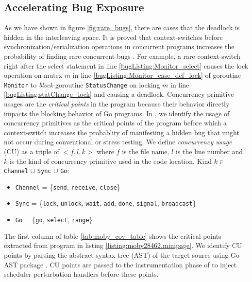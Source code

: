 \subsection{Accelerating Bug Exposure}
\label{sec:critical}
As we have shown in figure \ref{fig:rare_bugs}, there are cases that the deadlock is hidden in the interleaving space.
%
It is proved that context-switches before synchronization/serialization operations in concurrent programs increases the probability of finding rare concurrent bugs \cite{burckhardt-depthBug-asplos10}.
%
For example, a rare context-switch right after the select statement in line \ref{bugListing:Monitor_select} causes the lock operation on mutex $m$ in line \ref{bugListing:Monitor_case_def_lock} of goroutine \texttt{Monitor} to \textit{block} goroutine \texttt{StatusChange} on locking $m$ in line \ref{bugListing:statChange_lock} and causing a deadlock.
%
Concurrency primitive usages are the \textit{critical points} in the program because their behavior directly impacts the blocking behavior of Go programs.
%
In \goat, we identify the usage of concurrency primitives as the critical points of the program before which a context-switch increases the probablity of manifesting a hidden bug that might not occur during conventional or stress testing.
%
%
We define \textit{concurrency usage} (CU) as a triple of $<f,l,k>$ where $f$ is the file name, $l$ is the line number and $k$ is the kind of concurrency primitive used in the code location.
Kind $k\in$ \texttt{Channel} $\cup$ \texttt{Sync} $\cup$ \texttt{Go}:
\begin{itemize}
  \item \texttt{Channel} = \{\texttt{send}, \texttt{receive}, \texttt{close}\}
  \item \texttt{Sync} = \{\texttt{lock}, \texttt{unlock}, \texttt{wait}, \texttt{add}, \texttt{done}, \texttt{signal}, \texttt{broadcast}\}
  \item \texttt{Go} = \{\texttt{go}, \texttt{select}, \texttt{range}\}
\end{itemize}

The first column of table \ref{tab:moby_cov_table} shows the critical points extracted from program in listing \ref{listing:moby28462.minipage}.
%
We identify CU points by parsing the abstract syntax tree (AST) of the target source using Go AST package \cite{go-package-ast}.
%
CU points are passed to the instrumentation phase of \goat to inject scheduler perturbation handlers before these points.


